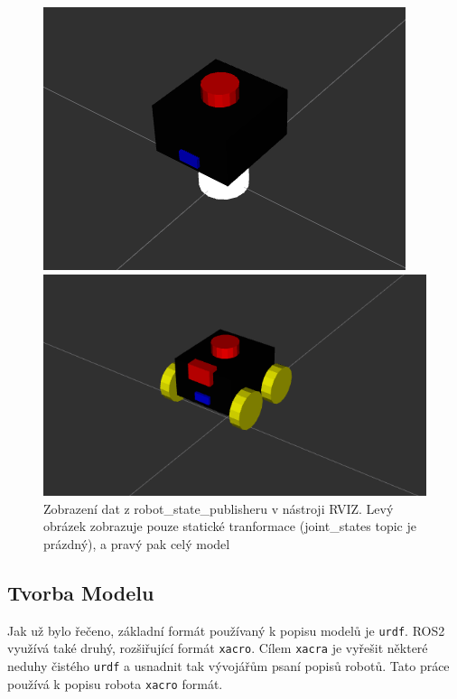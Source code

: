 \begin{figure}[h!]
	\centering
	\begin{minipage}[c]{0.5\textwidth}
		\centering
		\includegraphics[scale=0.45]{obrazky-figures/robot_description_no_joint_states.png}
	\end{minipage}%
	\begin{minipage}[c]{0.5\textwidth}
		\centering
		\includegraphics[scale=0.4]{obrazky-figures/robot_description_joint_states.png}
	\end{minipage}
	\caption[Zobrazení popisu robota v nástroji Rviz]{Zobrazení dat z robot\_state\_publisheru v nástroji RVIZ. Levý obrázek zobrazuje pouze statické tranformace (joint\_states topic je prázdný), a pravý pak celý model}
	\label{fig:rviz_robot_desc}
\end{figure}

\subsection*{Tvorba Modelu}
Jak už bylo řečeno, základní formát používaný k popisu modelů je \verb|urdf|. ROS2 využívá také druhý, rozšiřující formát \verb|xacro|. Cílem \verb|xacra| je vyřešit některé neduhy čistého \verb|urdf| a  usnadnit tak vývojářům psaní popisů robotů. Tato práce používá k popisu robota \verb|xacro| formát.

